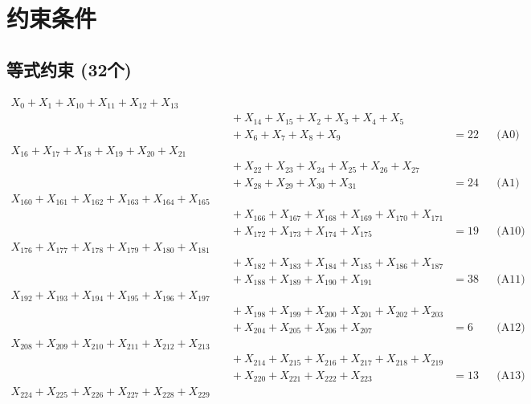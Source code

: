 \documentclass[a4paper,10pt]{article}
\begin{document}
\section{约束条件}

\subsection{等式约束 (32个)}

\allowdisplaybreaks
{\small\begin{align}
X_{0} + X_{1} + X_{10} + X_{11} + X_{12} + X_{13} \\[0.5ex]
&\quad  + X_{14} + X_{15} + X_{2} + X_{3} + X_{4} + X_{5} \\[0.5ex]
&\quad  + X_{6} + X_{7} + X_{8} + X_{9} &= 22 && \text{(A0)} \\
X_{16} + X_{17} + X_{18} + X_{19} + X_{20} + X_{21} \\[0.5ex]
&\quad  + X_{22} + X_{23} + X_{24} + X_{25} + X_{26} + X_{27} \\[0.5ex]
&\quad  + X_{28} + X_{29} + X_{30} + X_{31} &= 24 && \text{(A1)} \\
X_{160} + X_{161} + X_{162} + X_{163} + X_{164} + X_{165} \\[0.5ex]
&\quad  + X_{166} + X_{167} + X_{168} + X_{169} + X_{170} + X_{171} \\[0.5ex]
&\quad  + X_{172} + X_{173} + X_{174} + X_{175} &= 19 && \text{(A10)} \\
X_{176} + X_{177} + X_{178} + X_{179} + X_{180} + X_{181} \\[0.5ex]
&\quad  + X_{182} + X_{183} + X_{184} + X_{185} + X_{186} + X_{187} \\[0.5ex]
&\quad  + X_{188} + X_{189} + X_{190} + X_{191} &= 38 && \text{(A11)} \\
X_{192} + X_{193} + X_{194} + X_{195} + X_{196} + X_{197} \\[0.5ex]
&\quad  + X_{198} + X_{199} + X_{200} + X_{201} + X_{202} + X_{203} \\[0.5ex]
&\quad  + X_{204} + X_{205} + X_{206} + X_{207} &= 6 && \text{(A12)} \\
X_{208} + X_{209} + X_{210} + X_{211} + X_{212} + X_{213} \\[0.5ex]
&\quad  + X_{214} + X_{215} + X_{216} + X_{217} + X_{218} + X_{219} \\[0.5ex]
&\quad  + X_{220} + X_{221} + X_{222} + X_{223} &= 13 && \text{(A13)} \\
X_{224} + X_{225} + X_{226} + X_{227} + X_{228} + X_{229} \\[0.5ex]

\end{align}}
\end{document}
